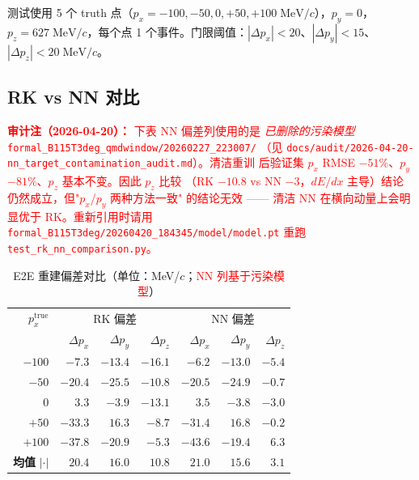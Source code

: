 \documentclass[a4paper, 11pt]{article}
\begin{document}
测试使用 5 个 truth 点（$p_x = -100, -50, 0, +50, +100\;\mathrm{MeV}/c$），$p_y = 0$，$p_z = 627\;\mathrm{MeV}/c$，每个点 1 个事件。门限阈值：$|{\Delta}p_x| < 20$、$|{\Delta}p_y| < 15$、$|{\Delta}p_z| < 20\;\mathrm{MeV}/c$。

\subsection{RK vs NN 对比}

\noindent\textcolor{red}{\textbf{审计注（2026-04-20）：} 下表 NN 偏差列使用的是
\emph{已删除的污染模型} \texttt{formal\_B115T3deg\_qmdwindow/20260227\_223007/}
（见 \texttt{docs/audit/2026-04-20-nn\_target\_contamination\_audit.md}）。清洁重训
后验证集 $p_x$ RMSE $-51\%$、$p_y$ $-81\%$、$p_z$ 基本不变。因此 $p_z$ 比较
（RK $-10.8$ vs NN $-3$，$dE/dx$ 主导）结论仍然成立，但"$p_x$/$p_y$ 两种方法一致"
的结论无效 —— 清洁 NN 在横向动量上会明显优于 RK。重新引用时请用
\texttt{formal\_B115T3deg/20260420\_184345/model/model.pt} 重跑
\texttt{test\_rk\_nn\_comparison.py}。}

\begin{table}[H]
\centering
\caption{E2E 重建偏差对比（单位：MeV/$c$；\textcolor{red}{NN 列基于污染模型}）}
\label{tab:e2e}
\begin{tabular}{rrrr|rrr}
\toprule
$p_x^\mathrm{true}$ & \multicolumn{3}{c|}{RK 偏差} & \multicolumn{3}{c}{NN 偏差} \\
 & $\Delta p_x$ & $\Delta p_y$ & $\Delta p_z$ & $\Delta p_x$ & $\Delta p_y$ & $\Delta p_z$ \\
\midrule
$-100$ & $-7.3$ & $-13.4$ & $-16.1$ & $-6.2$ & $-13.0$ & $-5.4$ \\
$-50$ & $-20.4$ & $-25.5$ & $-10.8$ & $-20.5$ & $-24.9$ & $-0.7$ \\
$0$ & $3.3$ & $-3.9$ & $-13.1$ & $3.5$ & $-3.8$ & $-3.0$ \\
$+50$ & $-33.3$ & $16.3$ & $-8.7$ & $-31.4$ & $16.8$ & $-0.2$ \\
$+100$ & $-37.8$ & $-20.9$ & $-5.3$ & $-43.6$ & $-19.4$ & $6.3$ \\
\midrule
\textbf{均值} $|\cdot|$ & $20.4$ & $16.0$ & $10.8$ & $21.0$ & $15.6$ & $3.1$ \\
\bottomrule
\end{tabular}
\end{table}
\end{document}
